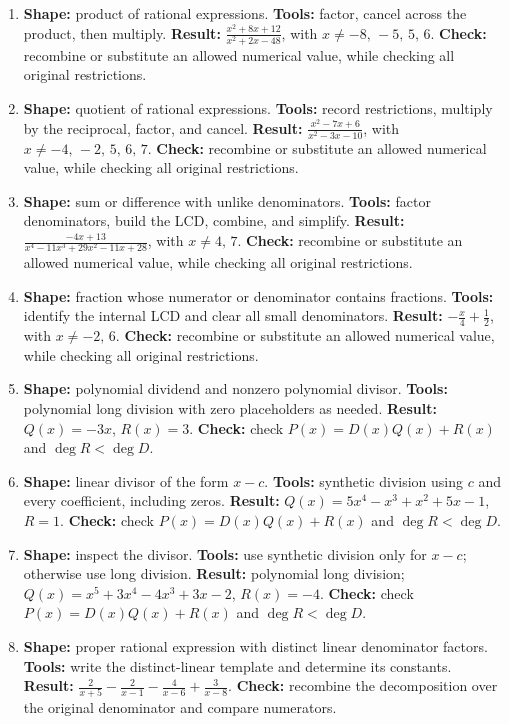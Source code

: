 \documentclass[11pt,oneside]{book}
\begin{document}
\begin{enumerate}[leftmargin=*,label=\textbf{CAP\arabic*.},itemsep=0.45\baselineskip]
\item \textbf{Shape:} product of rational expressions. \textbf{Tools:} factor, cancel across the product, then multiply. \textbf{Result:} $\displaystyle \frac{x^{2} + 8 x + 12}{x^{2} + 2 x - 48}$, with $x\ne -8,\,-5,\,5,\,6$. \textbf{Check:} recombine or substitute an allowed numerical value, while checking all original restrictions.
\item \textbf{Shape:} quotient of rational expressions. \textbf{Tools:} record restrictions, multiply by the reciprocal, factor, and cancel. \textbf{Result:} $\displaystyle \frac{x^{2} - 7 x + 6}{x^{2} - 3 x - 10}$, with $x\ne -4,\,-2,\,5,\,6,\,7$. \textbf{Check:} recombine or substitute an allowed numerical value, while checking all original restrictions.
\item \textbf{Shape:} sum or difference with unlike denominators. \textbf{Tools:} factor denominators, build the LCD, combine, and simplify. \textbf{Result:} $\displaystyle \frac{- 4 x + 13}{x^{4} - 11 x^{3} + 29 x^{2} - 11 x + 28}$, with $x\ne 4,\,7$. \textbf{Check:} recombine or substitute an allowed numerical value, while checking all original restrictions.
\item \textbf{Shape:} fraction whose numerator or denominator contains fractions. \textbf{Tools:} identify the internal LCD and clear all small denominators. \textbf{Result:} $\displaystyle - \frac{x}{4} + \frac{1}{2}$, with $x\ne -2,\,6$. \textbf{Check:} recombine or substitute an allowed numerical value, while checking all original restrictions.
\item \textbf{Shape:} polynomial dividend and nonzero polynomial divisor. \textbf{Tools:} polynomial long division with zero placeholders as needed. \textbf{Result:} $Q(x)=- 3 x$, $R(x)=3$. \textbf{Check:} check $P(x)=D(x)Q(x)+R(x)$ and $\deg R<\deg D$.
\item \textbf{Shape:} linear divisor of the form $x-c$. \textbf{Tools:} synthetic division using $c$ and every coefficient, including zeros. \textbf{Result:} $Q(x)=5 x^{4} - x^{3} + x^{2} + 5 x - 1$, $R=1$. \textbf{Check:} check $P(x)=D(x)Q(x)+R(x)$ and $\deg R<\deg D$.
\item \textbf{Shape:} inspect the divisor. \textbf{Tools:} use synthetic division only for $x-c$; otherwise use long division. \textbf{Result:} polynomial long division; $Q(x)=x^{5} + 3 x^{4} - 4 x^{3} + 3 x - 2$, $R(x)=-4$. \textbf{Check:} check $P(x)=D(x)Q(x)+R(x)$ and $\deg R<\deg D$.
\item \textbf{Shape:} proper rational expression with distinct linear denominator factors. \textbf{Tools:} write the distinct-linear template and determine its constants. \textbf{Result:} $\displaystyle \frac{2}{x + 5} - \frac{2}{x - 1} - \frac{4}{x - 6} + \frac{3}{x - 8}$. \textbf{Check:} recombine the decomposition over the original denominator and compare numerators.

\end{enumerate}
\end{document}

